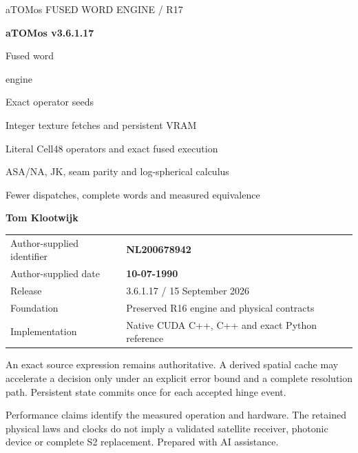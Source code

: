 

\begin{titlepage}\thispagestyle{empty}
{\sffamily\color{accent}\large aTOMos \hfill FUSED WORD ENGINE / R17}\par
\vspace{19mm}
{\sffamily\bfseries\fontsize{40}{48}\selectfont\color{ink}aTOMos v3.6.1.17}\par
\vspace{10mm}
{\sffamily\fontsize{34}{41}\selectfont Fused word\par engine}\par
\vspace{10mm}
{\sffamily\fontsize{19}{25}\selectfont\color{gold}Exact operator seeds\par Integer texture fetches and persistent VRAM}\par
\vspace{12mm}
{\large Literal Cell48 operators and exact fused execution\par
ASA/NA, JK, seam parity and log-spherical calculus\par
Fewer dispatches, complete words and measured equivalence}\par
\vspace{15mm}
{\sffamily\bfseries\Large Tom Klootwijk}\par
\begin{tabular}{@{}ll@{}}
Author-supplied identifier & \textbf{NL200678942}\\
Author-supplied date & \textbf{10-07-1990}\\
Release & 3.6.1.17 / 15 September 2026\\
Foundation & Preserved R16 engine and physical contracts\\
Implementation & Native CUDA C++, C++ and exact Python reference\\
\end{tabular}
\vfill
\begin{panel}
An exact source expression remains authoritative. A derived spatial cache
may accelerate a decision only under an explicit error bound and a complete
resolution path. Persistent state commits once for each accepted hinge event.
\end{panel}
{\small\color{muted}Performance claims identify the measured operation and
hardware. The retained physical laws and clocks do not imply a validated
satellite receiver, photonic device or complete S2 replacement. Prepared with AI assistance.}
\end{titlepage}
\setcounter{page}{2}

{\small\setlength{\parskip}{0pt}\tableofcontents}\clearpage






















\appendix


